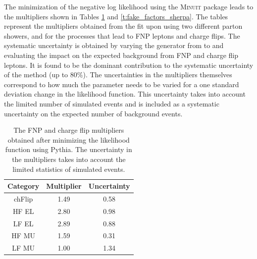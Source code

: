 The minimization of the negative log likelihood using the \textsc{Minuit} package leads 
to the multipliers shown in Tables \ref{t:fake_factors_powheg} and \ref{t:fake_factors_sherpa}.
The tables represent the multipliers obtained from the fit upon using two different parton showers, \POWHEGBOX and \SHERPA 
for the processes that lead to FNP leptons and charge flips.
The systematic uncertainty is obtained by varying the 
generator from \POWHEGBOX to \SHERPA and evaluating the impact on the expected background from FNP and charge flip leptons. 
It is found to be the dominant contribution to the systematic uncertainty of the method (up to 80\%).
The uncertainties in the multipliers themselves correspond to how much the parameter needs to be varied for 
a one standard deviation change in the likelihood function. This uncertainty takes into account the limited number of simulated events and is included as a 
systematic uncertainty on the expected number of background events. 

\begin{table}[!htb]
  \caption{The FNP and charge flip multipliers obtained after minimizing the likelihood function using Pythia.
    The uncertainty in the multipliers takes into account the limited statistics of simulated events.
    \label{t:fake_factors_powheg}}
  \centering
   \begin{tabular}{|c|c|c|}
          \hline
          Category & Multiplier & Uncertainty  \\
          \hline
          chFlip & 1.49 & 0.58 \\ 
          HF EL & 2.80 & 0.98 \\
          LF EL & 2.89 & 0.88 \\
          HF MU & 1.59 & 0.31 \\
          LF MU & 1.00 & 1.34 \\
          \hline
        \end{tabular}
\end{table}

